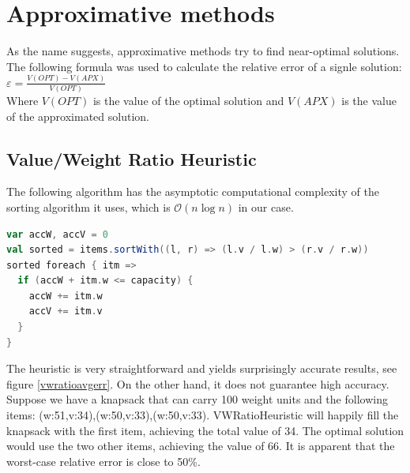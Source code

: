 \documentclass[a4paper,10pt,twocolumn]{article}
\begin{document}
\section{Approximative methods}
As the name suggests, approximative methods try to find near-optimal solutions. The following formula was used to
calculate the relative error of a signle solution: \\

$\varepsilon = \frac{V(OPT)-V(APX)}{V(OPT)}$ \\

Where $V(OPT)$ is the value of the optimal solution and $V(APX)$ is the value of the approximated solution.

\subsection{Value/Weight Ratio Heuristic}
The following algorithm has the asymptotic computational complexity of the sorting algorithm it uses,
which is $\mathcal{O}(n\log{n})$ in our case.

\begin{lstlisting}[frame=tlrb,language=scala,basicstyle=\scriptsize,label=vwRatioHeuristicCode,caption=VWRatioHeuristic]
var accW, accV = 0
val sorted = items.sortWith((l, r) => (l.v / l.w) > (r.v / r.w))
sorted foreach { itm =>
  if (accW + itm.w <= capacity) {
    accW += itm.w
    accV += itm.v
  }
}
\end{lstlisting}

The heuristic is very straightforward and yields surprisingly accurate results, see figure \ref{vwratioavgerr}. On the
other hand, it does not guarantee high accuracy. Suppose we have a knapsack that can carry 100 weight units and the
following items: {(w:51,v:34),(w:50,v:33),(w:50,v:33)}. VWRatioHeuristic will happily fill the knapsack with the first
item, achieving the total value of 34. The optimal solution would use the two other items, achieving the value of 66. It
is apparent that the worst-case relative error is close to 50\%.
\end{document}

